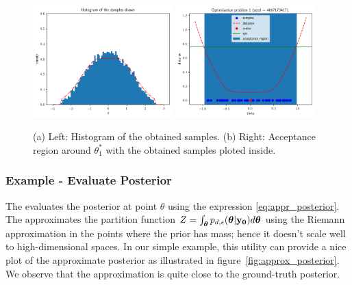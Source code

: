 \begin{figure}[h]
    \begin{center}
      \includegraphics[width=0.48\textwidth]{./Thesis/images/chapter3/example_marginal.png}
      \includegraphics[width=0.48\textwidth]{./Thesis/images/chapter3/example_region_samples.png}
    \end{center}
  \caption{(a) Left: Histogram of the obtained samples. (b) Right: Acceptance region around $\theta_1^*$ with the obtained samples ploted inside.}
  \label{fig:example_sampling}
\end{figure}

\subsubsection*{Example - Evaluate Posterior}

The  evaluates the
posterior at point $\theta$ using the expression
\eqref{eq:appr_posterior}. The 
approximates the partition function
$Z = \int_{\boldsymbol{\theta}} p_{d,\epsilon}(\boldsymbol{\theta}|\mathbf{y_0}) d\boldsymbol{\theta}$ using the
Riemann approximation in the points where the prior has mass; hence it
doesn't scale well to high-dimensional spaces. In our simple example,
this utility can provide a nice plot of the approximate posterior as
illustrated in figure~\ref{fig:approx_posterior}. We observe that the
approximation is quite close to the ground-truth posterior.

